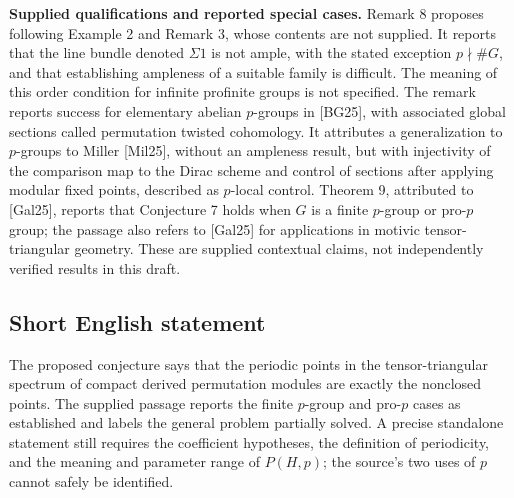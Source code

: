\documentclass[11pt]{article}
\begin{document}
\textbf{Supplied qualifications and reported special cases.} Remark 8 proposes following Example 2 and Remark 3, whose contents are not supplied. It reports that the line bundle denoted \(\Sigma 1\) is not ample, with the stated exception \(p\nmid\#G\), and that establishing ampleness of a suitable family is difficult. The meaning of this order condition for infinite profinite groups is not specified. The remark reports success for elementary abelian \(p\)-groups in [BG25], with associated global sections called permutation twisted cohomology. It attributes a generalization to \(p\)-groups to Miller [Mil25], without an ampleness result, but with injectivity of the comparison map to the Dirac scheme and control of sections after applying modular fixed points, described as \(p\)-local control. Theorem 9, attributed to [Gal25], reports that Conjecture 7 holds when \(G\) is a finite \(p\)-group or pro-\(p\) group; the passage also refers to [Gal25] for applications in motivic tensor-triangular geometry. These are supplied contextual claims, not independently verified results in this draft.
\subsection{Short English statement}
The proposed conjecture says that the periodic points in the tensor-triangular spectrum of compact derived permutation modules are exactly the nonclosed points. The supplied passage reports the finite \(p\)-group and pro-\(p\) cases as established and labels the general problem partially solved. A precise standalone statement still requires the coefficient hypotheses, the definition of periodicity, and the meaning and parameter range of \(P(H,p)\); the source's two uses of \(p\) cannot safely be identified.
\end{document}
